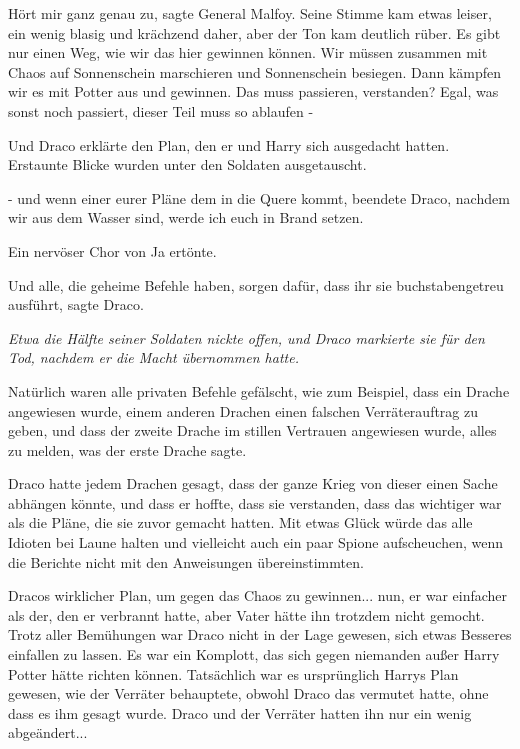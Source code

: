 \glqq{}Hört mir ganz genau zu\grqq{}, sagte General Malfoy. Seine Stimme kam
etwas leiser, ein wenig blasig und krächzend daher, aber der Ton kam deutlich
rüber. \glqq{}Es gibt nur einen Weg, wie wir das hier gewinnen können. Wir müssen
zusammen mit Chaos auf Sonnenschein marschieren und Sonnenschein besiegen. Dann
kämpfen wir es mit Potter aus und gewinnen. Das muss passieren, verstanden?
Egal, was sonst noch passiert, dieser Teil muss so ablaufen -\grqq{}

Und Draco erklärte den Plan, den er und Harry sich ausgedacht hatten. Erstaunte
Blicke wurden unter den Soldaten ausgetauscht.

\glqq{}- und wenn einer eurer Pläne dem in die Quere kommt\grqq{}, beendete
Draco, \glqq{}nachdem wir aus dem Wasser sind, werde ich euch in Brand setzen.\grqq{}

Ein nervöser Chor von \glqq{}Ja\grqq{} ertönte.

\glqq{}Und alle, die geheime Befehle haben, sorgen dafür, dass ihr sie
buchstabengetreu ausführt\grqq{}, sagte Draco.

\emph{Etwa die Hälfte seiner Soldaten nickte offen, und Draco markierte sie für
den Tod, nachdem er die Macht übernommen hatte.}

Natürlich waren alle privaten Befehle gefälscht, wie zum Beispiel, dass ein
Drache angewiesen wurde, einem anderen Drachen einen falschen Verräterauftrag zu
geben, und dass der zweite Drache im stillen Vertrauen angewiesen wurde, alles
zu melden, was der erste Drache sagte.

Draco hatte jedem Drachen gesagt, dass der ganze Krieg von dieser einen Sache
abhängen könnte, und dass er hoffte, dass sie verstanden, dass das wichtiger war
als die Pläne, die sie zuvor gemacht hatten. Mit etwas Glück würde das alle
Idioten bei Laune halten und vielleicht auch ein paar Spione aufscheuchen, wenn
die Berichte nicht mit den Anweisungen übereinstimmten.

Dracos wirklicher Plan, um gegen das Chaos zu gewinnen... nun, er war einfacher
als der, den er verbrannt hatte, aber Vater hätte ihn trotzdem nicht gemocht.
Trotz aller Bemühungen war Draco nicht in der Lage gewesen, sich etwas Besseres
einfallen zu lassen. Es war ein Komplott, das sich gegen niemanden außer Harry
Potter hätte richten können. Tatsächlich war es ursprünglich Harrys Plan
gewesen, wie der Verräter behauptete, obwohl Draco das vermutet hatte, ohne dass
es ihm gesagt wurde. Draco und der Verräter hatten ihn nur ein wenig
abgeändert...

